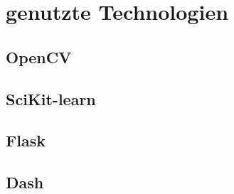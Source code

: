 \section{genutzte Technologien}

\subsection{OpenCV}

\subsection{SciKit-learn}

\subsection{Flask}

\subsection{Dash}
